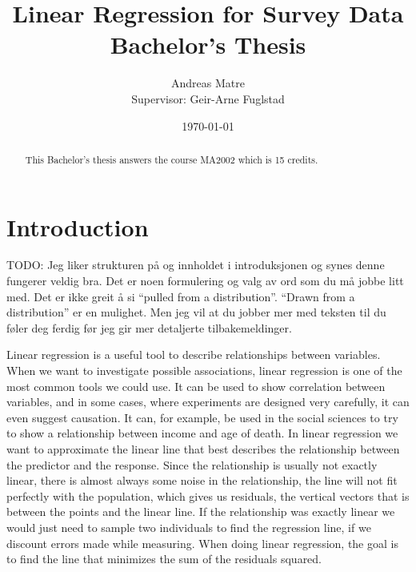 \documentclass{article}
\title{Linear Regression for Survey Data \\
{\Large Bachelor's Thesis}}
\author{Andreas Matre \\
Supervisor: Geir-Arne Fuglstad}
\date{\today}
\begin{document}
\newtheorem{definition}{Definition}
\newtheorem{theorem}{Theorem}
\newtheorem{example}{Example}


\maketitle

\begin{abstract}
  This Bachelor's thesis answers the course MA2002 which is 15 credits.
\end{abstract}

\newpage

\tableofcontents

\newpage

\section{Introduction}

TODO: Jeg liker strukturen på og innholdet i introduksjonen og synes denne fungerer veldig bra. Det er noen formulering og valg av ord som du må jobbe litt med. Det er ikke greit å si “pulled from a distribution”. “Drawn from a distribution” er en mulighet. Men jeg vil at du jobber mer med teksten til du føler deg ferdig før jeg gir mer detaljerte tilbakemeldinger. \cite{st1101}

Linear regression is a useful tool to describe relationships between variables.
When we want to investigate possible associations, linear regression
is one of the most common tools we could use. It can be used to show correlation between
variables, and in some cases, where experiments are designed very carefully, it can even suggest causation.
It can, for example, be used in the social sciences to try to show a relationship
between income and age of death. In linear regression we want to approximate the
linear line that best describes the relationship between the predictor and the
response. Since the relationship is usually not exactly linear, there is almost
always some noise in the relationship, the line will not
fit perfectly with the population, which gives us residuals, the vertical
vectors that is between the points and the linear line. If the relationship was
exactly linear we would just need to sample two individuals to find the
regression line, if we discount errors made while measuring. When doing linear
regression, the goal is to find the line that minimizes the sum of the residuals squared.
\end{document}
